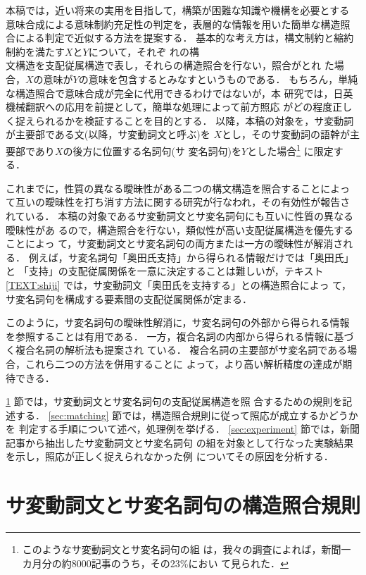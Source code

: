 本稿では，近い将来の実用を目指して，構築が困難な知識や機構を必要とする
意味合成による意味制約充足性の判定を，表層的な情報を用いた簡単な構造照
合による判定で近似する方法を提案する．
基本的な考え方は，構文制約と縮約制約を満たす$X$と$Y$について，それぞ
れの構\\文構造を支配従属構造で表し，それらの構造照合を行ない，照合がとれ
た場合，$X$の意味が$Y$の意味を包含するとみなすというものである．
もちろん，単純な構造照合で意味合成が完全に代用できるわけではないが，本
研究では，日英機械翻訳への応用を前提として，簡単な処理によって前方照応
がどの程度正しく捉えられるかを検証することを目的とする．
以降，本稿の対象を，サ変動詞が主要部である文(以降，サ変動詞文と呼ぶ)を
$X$とし，そのサ変動詞の語幹が主要部であり$X$の後方に位置する名詞句(サ
変名詞句)を$Y$とした場合\footnote{このようなサ変動詞文とサ変名詞句の組
は，我々の調査によれば，新聞一カ月分の約8000記事のうち，その23\%におい
て見られた．}
に限定する．

これまでに，性質の異なる曖昧性がある二つの構文構造を照合することによっ
て互いの曖昧性を打ち消す方法に関する研究が行なわれ，その有効性が報告さ
れている\cite{Inagaki88,Utsuro92,Kinoshita93,Nasukawa95b}．
本稿の対象であるサ変動詞文とサ変名詞句にも互いに性質の異なる曖昧性があ
るので，構造照合を行ない，類似性が高い支配従属構造を優先することによっ
て，サ変動詞文とサ変名詞句の両方または一方の曖昧性が解消される．
例えば，サ変名詞句「奥田氏支持」から得られる情報だけでは「奥田氏」と
「支持」の支配従属関係を一意に決定することは難しいが，テキスト
\ref{TEXT:shiji} では，サ変動詞文「奥田氏を支持する」との構造照合によっ
て，サ変名詞句を構成する要素間の支配従属関係が定まる．

このように，サ変名詞句の曖昧性解消に，サ変名詞句の外部から得られる情報
を参照することは有用である．
一方，複合名詞の内部から得られる情報に基づく複合名詞の解析法も提案され
ている\cite{Kobayashi96}．
複合名詞の主要部がサ変名詞である場合，これら二つの方法を併用することに
よって，より高い解析精度の達成が期待できる．

\ref{sec:depredrules} 節では，サ変動詞文とサ変名詞句の支配従属構造を照
合するための規則を記述する．
\ref{sec:matching} 節では，構造照合規則に従って照応が成立するかどうかを
判定する手順について述べ，処理例を挙げる．
\ref{sec:experiment} 節では，新聞記事から抽出したサ変動詞文とサ変名詞句
の組を対象として行なった実験結果を示し，照応が正しく捉えられなかった例
についてその原因を分析する．

\section{サ変動詞文とサ変名詞句の構造照合規則}
\label{sec:depredrules}

